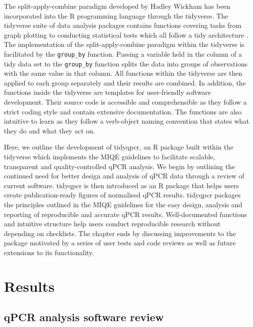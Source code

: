 \documentclass[../main.tex]{subfiles}
\begin{document}
The split-apply-combine paradigm developed by Hadley Wickham has been incorporated into the R programming language through the tidyverse.
The tidyverse suite of data analysis packages contains functions covering tasks from graph plotting to conducting statistical tests which all follow a tidy architecture \parencite{Wickham2014}. 
The implementation of the split-apply-combine paradigm within the tidyverse is facilitated by the \lstinline{group_by} function.
Passing a variable held in the column of a tidy data set to the \lstinline{group_by} function splits the data into groups of observations with the same value in that column.
All functions within the tidyverse are then applied to each group separately and their results are combined. 
In addition, the functions inside the tidyverse are templates for user-friendly software development.
Their source code is accessible and comprehensible as they follow a strict coding style and contain extensive documentation.
The functions are also intuitive to learn as they follow a verb-object naming convention that states what they do and what they act on.


Here, we outline the development of tidyqpcr, an R package built within the tidyverse which implements the MIQE guidelines to facilitate scalable, transparent and quality-controlled qPCR analysis.
We begin by outlining the continued need for better design and analysis of qPCR data through a review of current software.
tidyqpcr is then introduced as an R package that helps users create publication-ready figures of normalised qPCR results. 
tidyqpcr packages the principles outlined in the MIQE guidelines for the easy design, analysis and reporting of reproducible and accurate qPCR results.
Well-documented functions and intuitive structure help users conduct reproducible research without depending on checklists.
The chapter ends by discussing improvements to the package motivated by a series of user tests and code reviews as well as future extensions to its functionality.

\section{Results}

\subsection{qPCR analysis software review}
\end{document}
